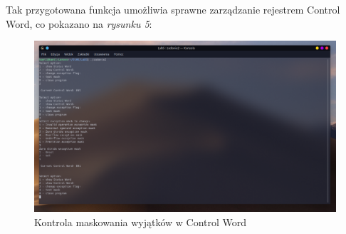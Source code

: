 \documentclass[a4paper,12pt]{article}
\begin{document}
Tak przygotowana funkcja umożliwia sprawne zarządzanie rejestrem Control Word, co pokazano na \textit{rysunku 5}:
\begin{center}
	\begin{figure}[h]
		\centering\includegraphics[width=17cm]{Materialy/Lab5/maska}
		\caption{Kontrola maskowania wyjątków w Control Word}
		\label{maska}
	\end{figure}
\end{center}
\newpage
\end{document}
